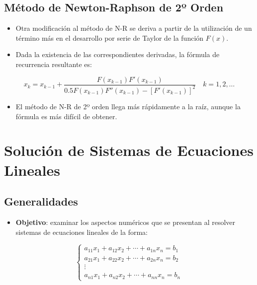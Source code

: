 \documentclass[openany]{book}
\providecommand{\tightlist}{%
  \setlength{\itemsep}{0pt}\setlength{\parskip}{0pt}}
\begin{document}
\hypertarget{muxe9todo-de-newton-raphson-de-2uxba-orden}{%
\section{Método de Newton-Raphson de 2º Orden}\label{muxe9todo-de-newton-raphson-de-2uxba-orden}}

\begin{itemize}
\tightlist
\item
  Otra modificación al método de N-R se deriva a partir de la utilización de un término más en el desarrollo por serie de Taylor de la función \(F(x)\).
\item
  Dada la existencia de las correspondientes derivadas, la fórmula de recurrencia resultante es:
\end{itemize}

\[
x_k = x_{k-1} + \frac{F(x_{k-1})F'(x_{k-1})}{0.5 F(x_{k-1}) F''(x_{k-1}) - [F'(x_{k-1})]^2} \quad k = 1, 2, \dots
\]

\begin{itemize}
\tightlist
\item
  El método de N-R de 2º orden llega más rápidamente a la raíz, aunque la fórmula es más difícil de obtener.
\end{itemize}

\hypertarget{soluciuxf3n-de-sistemas-de-ecuaciones-lineales}{%
\chapter{Solución de Sistemas de Ecuaciones Lineales}\label{soluciuxf3n-de-sistemas-de-ecuaciones-lineales}}

\hypertarget{generalidades-1}{%
\section{Generalidades}\label{generalidades-1}}

\begin{itemize}
\tightlist
\item
  \textbf{Objetivo}: examinar los aspectos numéricos que se presentan al resolver sistemas de ecuaciones lineales de la forma:
\end{itemize}

\[
\begin{cases} 
a_{11}x_1 + a_{12}x_2 + \cdots + a_{1n}x_n = b_1 \\
a_{21}x_1 + a_{22}x_2 + \cdots + a_{2n}x_n = b_2 \\
\vdots \\
a_{n1}x_1 + a_{n2}x_2 + \cdots + a_{nn}x_n = b_n
\end{cases}
\]
\end{document}
